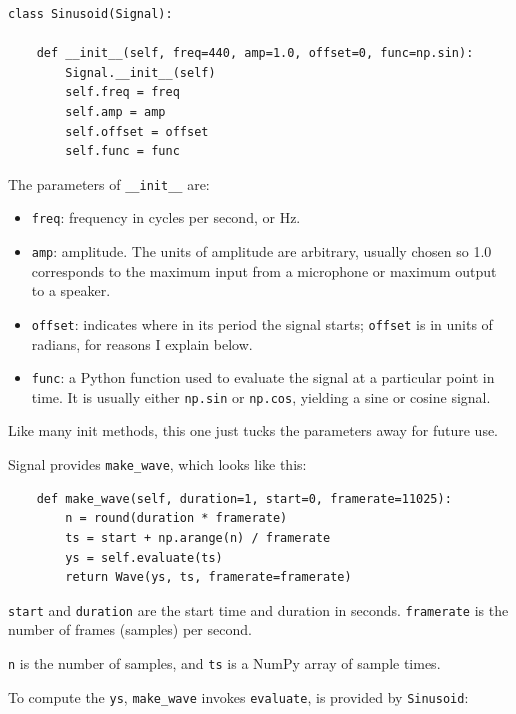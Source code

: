 \documentclass[12pt]{book}
\begin{document}
\begin{verbatim}
class Sinusoid(Signal):
    
    def __init__(self, freq=440, amp=1.0, offset=0, func=np.sin):
        Signal.__init__(self)
        self.freq = freq
        self.amp = amp
        self.offset = offset
        self.func = func
\end{verbatim}

The parameters of \verb"__init__" are:

\begin{itemize}

\item {\tt freq}: frequency in cycles per second, or Hz.

\item {\tt amp}: amplitude.  The units of amplitude are arbitrary,
usually chosen so 1.0 corresponds to the maximum input from a
microphone or maximum output to a speaker.

\item {\tt offset}: indicates where in its period the signal starts;
{\tt offset} is in units of radians, for reasons I explain below.

\item {\tt func}: a Python function used
to evaluate the signal at a particular point in time.  It is
usually either {\tt np.sin} or {\tt np.cos}, yielding a sine or
cosine signal.

\end{itemize}

Like many init methods, this one just tucks the parameters away for
future use.

Signal provides \verb"make_wave", which looks like
this:

\begin{verbatim}
    def make_wave(self, duration=1, start=0, framerate=11025):
        n = round(duration * framerate)
        ts = start + np.arange(n) / framerate
        ys = self.evaluate(ts)
        return Wave(ys, ts, framerate=framerate)
\end{verbatim}

{\tt start} and {\tt duration} are the start time and duration
in seconds.  {\tt framerate} is the number of frames (samples)
per second.

{\tt n} is the number of samples, and {\tt ts} is a NumPy array
of sample times.

To compute the {\tt ys}, \verb"make_wave" invokes {\tt evaluate}, 
is provided by {\tt Sinusoid}:
\end{document}
